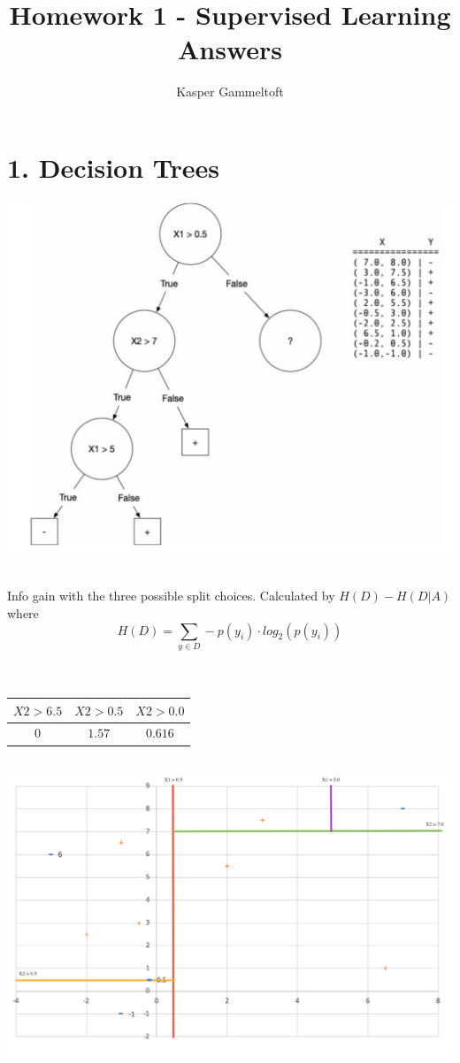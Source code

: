 \documentclass[12pt, oneside]{article}   	%
\title{Homework 1 - Supervised Learning Answers}
\author{Kasper Gammeltoft}
\begin{document}
\maketitle

\section{1. Decision Trees}

\includegraphics[scale=0.8]{decision_tree}

\subsection{}
Info gain with the three possible split choices.  Calculated by $H(D) - H(D|A)$ where\\ 
$$H(D) = \sum_{y\in D} -p(y_i) \cdot log_2(p(y_i))$$\\ \\
\begin{tabular}{c | c | c}
	$X2 > 6.5$ & $X2 > 0.5$ & $X2 > 0.0$ \\
	\hline
	$0$ & $1.57$ & $0.616$ \\
\end{tabular}

\subsection{}

\includegraphics[scale=0.8]{decisionboundaryplot}
\end{document}
